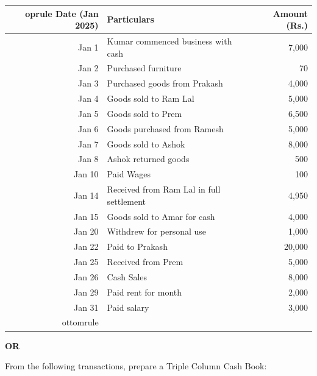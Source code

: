 \documentclass[11pt,a4paper]{article}
\begin{document}
\begin{center}
\small

\begin{tabular}{r p{8cm} r}
 oprule
   \textbf{Date (Jan 2025)} &   \textbf{Particulars} &   \textbf{Amount (Rs.)} \\
\midrule
Jan 1 & Kumar commenced business with cash & 7,000 \\
Jan 2 & Purchased furniture & 70 \\
Jan 3 & Purchased goods from Prakash & 4,000 \\
Jan 4 & Goods sold to Ram Lal & 5,000 \\
Jan 5 & Goods sold to Prem & 6,500 \\
Jan 6 & Goods purchased from Ramesh & 5,000 \\
Jan 7 & Goods sold to Ashok & 8,000 \\
Jan 8 & Ashok returned goods & 500 \\
Jan 10 & Paid Wages & 100 \\
Jan 14 & Received from Ram Lal in full settlement & 4,950 \\
Jan 15 & Goods sold to Amar for cash & 4,000 \\
Jan 20 & Withdrew for personal use & 1,000 \\
Jan 22 & Paid to Prakash & 20,000 \\
Jan 25 & Received from Prem & 5,000 \\
Jan 26 & Cash Sales & 8,000 \\
Jan 29 & Paid rent for month & 2,000 \\
Jan 31 & Paid salary & 3,000 \\
ottomrule
\end{tabular}
\end{center}


\begin{center}   \textbf{OR}\end{center}

From the following transactions, prepare a Triple Column Cash Book:
\end{document}
